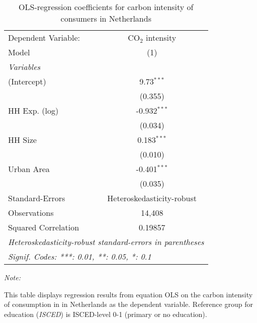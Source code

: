 
\begin{table}[htbp!]
   \centering
   \small
   \begin{adjustbox}{width = 1\textwidth, max height = 0.95\textheight, center}
      \begin{threeparttable}[b]
         \caption{\label{tab:OLS_1_NLD} OLS-regression coefficients for carbon intensity of consumers in Netherlands}
         \begin{tabular}{lc}
            \tabularnewline \midrule \midrule
            Dependent Variable: & CO$_{2}$ intensity\\  
            Model               & (1)\\  
            \midrule
            \emph{Variables}\\
            (Intercept)         & 9.73$^{***}$\\   
                                & (0.355)\\   
            HH Exp. (log)       & -0.932$^{***}$\\   
                                & (0.034)\\   
            HH Size             & 0.183$^{***}$\\   
                                & (0.010)\\   
            Urban Area          & -0.401$^{***}$\\   
                                & (0.035)\\   
            \midrule 
            Standard-Errors     & Heteroskedasticity-robust \\   
            Observations        & 14,408\\  
            Squared Correlation & 0.19857\\  
            \midrule \midrule
            \multicolumn{2}{l}{\emph{Heteroskedasticity-robust standard-errors in parentheses}}\\
            \multicolumn{2}{l}{\emph{Signif. Codes: ***: 0.01, **: 0.05, *: 0.1}}\\
         \end{tabular}
         
         \begin{tablenotes}\item \medskip \textit{Note:}
            \item This table displays regression results from equation OLS on the carbon intensity of consumption in  in Netherlands as the dependent variable. Reference group for education (\textit{ISCED}) is ISCED-level 0-1 (primary or no education).
         \end{tablenotes}
      \end{threeparttable}
   \end{adjustbox}
\end{table}


